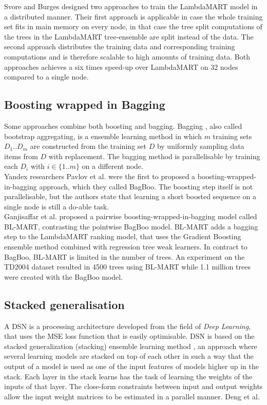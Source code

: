 Svore and Burges \cite{Svore2010,Svore2012} designed two approaches to train the LambdaMART \cite{Wu2008} model in a distributed manner. Their first approach is applicable in case the whole training set fits in main memory on every node, in that case the tree split computations of the trees in the LambdaMART tree-ensemble are split instead of the data. The second approach distributes the training data and corresponding training computations and is therefore scalable to high amounts of training data. Both approaches achieves a six times speed-up over LambdaMART on 32 nodes compared to a single node.

\subsection{Boosting wrapped in Bagging}
Some approaches combine both boosting and bagging. Bagging \cite{Breiman1996}, also called bootstrap aggregating, is a ensemble learning method in which $m$ training sets $D_1..D_m$ are constructed from the training set $D$ by uniformly sampling data items from $D$ with replacement. The bagging method is parallelisable by training each $D_i$ with $i \in \{1..m\}$ on a different node.\\

Yandex researchers Pavlov et al. \cite{Pavlov2010} were the first to proposed a boosting-wrapped-in-bagging approach, which they called BagBoo. The boosting step itself is not parallelisable, but the authors state that learning a short boosted sequence on a single node is still a do-able task.\\

Ganjisaffar et al. \cite{Ganjisaffar2011c, Ganjisaffar2011b} proposed a pairwise boosting-wrapped-in-bagging model called BL-MART, contrasting the pointwise BagBoo model. BL-MART adds a bagging step to the LambdaMART \cite{Wu2008} ranking model, that uses the Gradient Boosting \cite{Friedman2002} ensemble method combined with regression tree weak learners. In contract to BagBoo, BL-MART is limited in the number of trees. An experiment on the TD2004 dataset resulted in 4500 trees using BL-MART while 1.1 million trees were created with the BagBoo model.

\subsection{Stacked generalisation}
A \ac{DSN} is a processing architecture developed from the field of \emph{Deep Learning}, that uses the \ac{MSE} loss function that is easily optimisable. \ac{DSN} is based on the stacked generalization (stacking) ensemble learning method \cite{Wolpert1992}, an approach where several learning models are stacked on top of each other in such a way that the output of a model is used as one of the input features of models higher up in the stack. Each layer in the stack learns has the task of learning the weights of the inputs of that layer. The close-form constraints between input and output weights allow the input weight matrices to be estimated in a parallel manner. Deng et al. \cite{Deng2013} %

